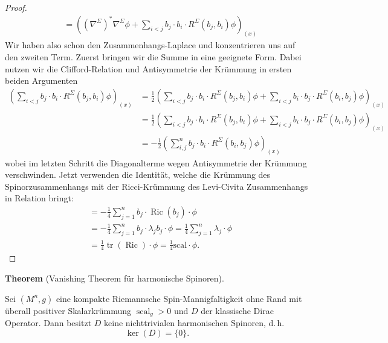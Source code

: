 \documentclass[10pt, letterpaper]{article}
\newcommand{\CustomHeading}[3]{%
  \par\medskip\noindent%
  \textbf{#1 #2} \textnormal{(#3)}.\enskip%
}
\newenvironment{THEO}[2]{\CustomHeading{Theorem}{#1}{#2}}{}
\begin{document}
\begin{proof}
$$\begin{aligned}
    & =\left(\left(\nabla^{\Sigma}\right)^* \nabla^{\Sigma} \phi+\sum_{i<j} b_j \cdot b_i \cdot R^{\Sigma}\left(b_j, b_i\right) \phi\right)_{(x)}
  \end{aligned}$$
  Wir haben also schon den Zusammenhangs-Laplace und konzentrieren uns auf den zweiten Term. Zuerst bringen wir die Summe in eine geeignete Form. Dabei nutzen wir die Clifford-Relation und Antisymmetrie der Krümmung in ersten beiden Argumenten
  $$\begin{aligned}
    \left(\sum_{i<j} b_j \cdot b_i \cdot R^{\Sigma}\left(b_j, b_i\right) \phi\right)_{(x)} 
    & = \frac{1}{2}\left(\sum_{i<j} b_j \cdot b_i \cdot R^{\Sigma}\left(b_j, b_i\right) \phi + \sum_{i<j} b_i \cdot b_j \cdot R^{\Sigma}\left(b_i, b_j\right) \phi\right)_{(x)} \\
    & = \frac{1}{2}\left(\sum_{i<j} b_j \cdot b_i \cdot R^{\Sigma}\left(b_j, b_i\right) \phi + \sum_{i<j} b_i \cdot b_j \cdot R^{\Sigma}\left(b_i, b_j\right) \phi\right)_{(x)} \\
    & =- \frac{1}{2}\left(\sum_{i,j}^n b_j \cdot b_i \cdot R^{\Sigma}\left(b_i, b_j\right) \phi \right)_{(x)} 
  \end{aligned}$$
  wobei im letzten Schritt die Diagonalterme wegen Antisymmetrie der Krümmung verschwinden. Jetzt verwenden die Identität, welche die Krümmung des Spinorzusammenhangs mit der Ricci-Krümmung des Levi-Civita Zusammenhangs in Relation bringt:
  $$\begin{aligned} 
    &=-\frac{1}{4} \sum_{j=1}^n b_j \cdot \operatorname{Ric}\left(b_j\right) \cdot \phi \\ 
    & =-\frac{1}{4} \sum_{j=1}^n b_j \cdot \lambda_j b_j \cdot \phi=\frac{1}{4} \sum_{j=1}^n \lambda_j \cdot \phi \\ 
    & =\frac{1}{4} \operatorname{tr}(\operatorname{Ric}) \cdot \phi=\frac{1}{4} \mathrm{scal} \cdot \phi.
  \end{aligned}$$

\end{proof}


\begin{THEO}{}{Vanishing Theorem für harmonische Spinoren}
Sei $(M^n,g)$ eine kompakte Riemannsche Spin-Mannigfaltigkeit ohne Rand mit überall
positiver Skalarkrümmung $\operatorname{scal}_g>0$ und $D$ der
klassische Dirac Operator. Dann besitzt $D$ keine nichttrivialen
harmonischen Spinoren, d.\,h.
\[
\ker(D)=\{0\}.
\]
\end{THEO}
\end{document}
